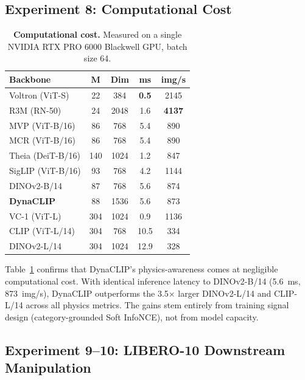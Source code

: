 \documentclass{article}
\newcommand{\methodname}{DynaCLIP}
\newcommand{\best}[1]{\textbf{#1}}
\begin{document}
\subsection{Experiment 8: Computational Cost}
\label{sec:exp_cost}

\begin{table}
\vspace{-1.5em}
\centering
\caption{\textbf{Computational cost.} Measured on a single NVIDIA RTX PRO 6000 Blackwell GPU, batch size 64.}
\label{tab:cost}
\small
\begin{tabular}{@{}lcccc@{}}
\toprule
\textbf{Backbone} & \textbf{M} & \textbf{Dim} & \textbf{ms} & \textbf{img/s} \\
\midrule
Voltron (ViT-S) & 22 & 384 & \best{0.5} & 2145 \\
R3M (RN-50) & 24 & 2048 & 1.6 & \best{4137} \\
MVP (ViT-B/16) & 86 & 768 & 5.4 & 890 \\
MCR (ViT-B/16) & 86 & 768 & 5.4 & 890 \\
Theia (DeiT-B/16) & 140 & 1024 & 1.2 & 847 \\
SigLIP (ViT-B/16) & 93 & 768 & 4.2 & 1144 \\
DINOv2-B/14 & 87 & 768 & 5.6 & 874 \\
\textbf{\methodname{}} & 88 & 1536 & 5.6 & 873 \\
VC-1 (ViT-L) & 304 & 1024 & 0.9 & 1136 \\
CLIP (ViT-L/14) & 304 & 768 & 10.5 & 334 \\
DINOv2-L/14 & 304 & 1024 & 12.9 & 328 \\
\bottomrule
\end{tabular}
\vspace{-1em}
\end{table}

Table~\ref{tab:cost} confirms that \methodname{}'s physics-awareness comes at negligible computational cost. With identical inference latency to DINOv2-B/14 (5.6~ms, 873~img/s), \methodname{} outperforms the 3.5$\times$ larger DINOv2-L/14 and CLIP-L/14 across all physics metrics. The gains stem entirely from training signal design (category-grounded Soft InfoNCE), not from model capacity.


\subsection{Experiment 9--10: LIBERO-10 Downstream Manipulation}
\label{sec:exp_libero}
\end{document}
